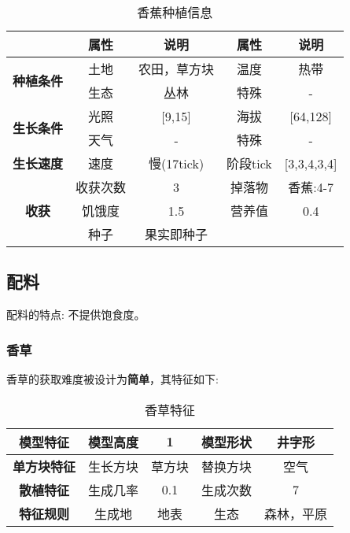 \begin{table}[H]
    \centering
    \caption{香蕉种植信息}
    \label{table:香蕉种植信息}
    \setlength{\tabcolsep}{4mm}
    \begin{tabular}{c|cc|cc}
        \toprule
                                           & \textbf{属性} & \textbf{说明}    & \textbf{属性} & \textbf{说明}   \\
        \midrule
        \multirow{2}{*}{\textbf{种植条件}} & 土地          & 农田，草方块            & 温度          & 热带      \\
                                           & 生态          & 丛林 & 特殊          & - \\
        \midrule
        \multirow{2}{*}{\textbf{生长条件}} & 光照          & [9,15]          & 海拔          & [64,128]        \\
                                           & 天气          & -               & 特殊          & -              \\
        \midrule
        \textbf{生长速度}                  & 速度          & 慢(17tick)        & 阶段tick      & [3,3,4,3,4]         \\
        \midrule
        \multirow{3}{*}{\textbf{收获}}     & 收获次数      & 3                & 掉落物        & 香蕉:4-7        \\
                                           & 饥饿度        & 1.5                & 营养值        & 0.4             \\
                                           & 种子 & 果实即种子 \\
        \bottomrule
    \end{tabular}
\end{table}


\subsection{配料}

配料的特点: 不提供饱食度。

\subsubsection{香草}

香草的获取难度被设计为\textbf{简单}，其特征如下:
\begin{table}[H]
    \centering
    \caption{香草特征}
    \label{table:香草特征}
    \setlength{\tabcolsep}{4mm}
    \begin{tabular}{c|cc|cc}
        \toprule
        \textbf{模型特征}   & 模型高度 & 1      & 模型形状 & 井字形     \\
        \midrule
        \textbf{单方块特征} & 生长方块 & 草方块 & 替换方块 & 空气       \\
        \midrule
        \textbf{散植特征}   & 生成几率 & 0.1    & 生成次数 & 7          \\
        \midrule
        \textbf{特征规则}   & 生成地   & 地表   & 生态     & 森林，平原 \\
        \bottomrule
    \end{tabular}
\end{table}


